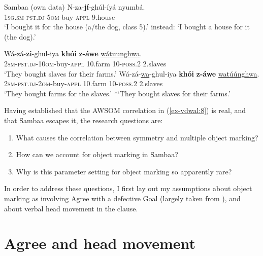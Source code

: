 \documentclass[output=paper
,modfonts
,nonflat]{langsci/langscibook}
\begin{document}
\begin{exe} \settowidth{}
\ex Sambaa (own data) \label{ex-vdwal:10} \newline
	\gll N-za-\textbf{jí}-ghúl-íyá nyumbá.\\
		\textsc{1sg.sm-pst.dj-5om}-buy-\textsc{appl} 9.house\\
	\glt *`I bought it for the house (a/the dog, class 5).' 
	instead: `I bought a house for it (the dog).' 
\end{exe}\largerpage[-2]

\begin{exe} \settowidth{}
\ex \label{ex-vdwal:11}
	\xlist
	\ex
		\gll Wá-zá-\textbf{zi}-ghul-iya \textbf{khói} \textbf{z-áwe} \uline{wátuunghwa}.\\
		\textsc{2sm-pst.dj-10om}-buy-\textsc{appl} 10.farm 10-\textsc{poss}.2 2.slaves\\
		\glt `They bought slaves for their farms.' 
	\ex 
		\gll Wá-zá-\uline{wa}-ghul-iya \textbf{khói} \textbf{z-áwe} \uline{watúúnghwa}.\\
		\textsc{2sm-pst.dj-2om}-buy-\textsc{appl} 10.farm 10-\textsc{poss}.2 2.slaves\\
		\glt `They bought farms for the slaves.'      
		*`They bought slaves for their farms.'  
	\endxlist
\end{exe}
Having established that the AWSOM correlation in (\ref{ex-vdwal:8}) is real, and that Sambaa escapes it, the research questions are:

\begin{enumerate}\label{vdw:researchquestions}
\item What causes the correlation between symmetry and multiple object marking?
\item How can we account for object marking in Sambaa?
\item Why is this parameter setting for object marking so apparently rare?
\end{enumerate}
In order to address these questions, I first lay out my assumptions about object marking as involving Agree with a defective Goal (largely taken from \citealt{Van_der_Wal2015}), and about verbal head movement in the clause.

\section{Agree and head movement}\label{sec-vdwal:4}
\end{document}
